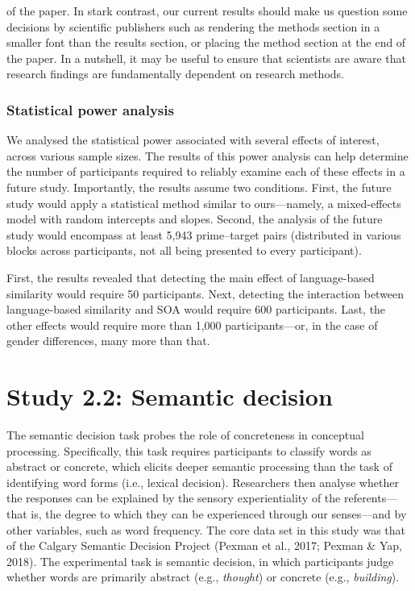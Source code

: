 \documentclass[
  12pt,
  man,floatsintext]{apa7}
\begin{document}
of the paper. In stark contrast, our current results should make us question some decisions by scientific publishers such as rendering the methods section in a smaller font than the results section, or placing the method section at the end of the paper. In a nutshell, it may be useful to ensure that scientists are aware that research findings are fundamentally dependent on research methods.

\hypertarget{statistical-power-analysis-3}{%
\subsubsection{Statistical power analysis}\label{statistical-power-analysis-3}}

We analysed the statistical power associated with several effects of interest, across various sample sizes. The results of this power analysis can help determine the number of participants required to reliably examine each of these effects in a future study. Importantly, the results assume two conditions. First, the future study would apply a statistical method similar to ours---namely, a mixed-effects model with random intercepts and slopes. Second, the analysis of the future study would encompass at least 5,943 prime--target pairs (distributed in various blocks across participants, not all being presented to every participant).

First, the results revealed that detecting the main effect of language-based similarity would require 50 participants. Next, detecting the interaction between language-based similarity and SOA would require 600 participants. Last, the other effects would require more than 1,000 participants---or, in the case of gender differences, many more than that.

\clearpage

\hypertarget{study-2.2-semantic-decision}{%
\section{Study 2.2: Semantic decision}\label{study-2.2-semantic-decision}}

The semantic decision task probes the role of concreteness in conceptual processing. Specifically, this task requires participants to classify words as abstract or concrete, which elicits deeper semantic processing than the task of identifying word forms (i.e., lexical decision). Researchers then analyse whether the responses can be explained by the sensory experientiality of the referents---that is, the degree to which they can be experienced through our senses---and by other variables, such as word frequency. The core data set in this study was that of the Calgary Semantic Decision Project (Pexman et al., 2017; Pexman \& Yap, 2018). The experimental task is semantic decision, in which participants judge whether words are primarily abstract (e.g., \emph{thought}) or concrete (e.g., \emph{building}).
\end{document}
